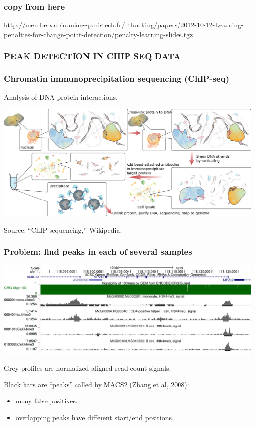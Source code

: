 \documentclass{beamer}
\begin{document}
\begin{frame}
  \frametitle{copy from here}
  http://members.cbio.mines-paristech.fr/~thocking/papers/2012-10-12-Learning-penalties-for-change-point-detection/penalty-learning-slides.tgz
\end{frame}

\begin{frame}
  \frametitle{PEAK DETECTION IN CHIP SEQ DATA}
  
\end{frame}

\begin{frame}
  \frametitle{Chromatin immunoprecipitation sequencing (ChIP-seq)}
  Analysis of DNA-protein interactions.

  \includegraphics[width=\textwidth]{Chromatin_immunoprecipitation_sequencing_wide.png}

  Source: ``ChIP-sequencing,'' Wikipedia.
\end{frame}

\begin{frame}
  \frametitle{Problem: find peaks in each of several samples}
  \includegraphics[width=\textwidth]{screenshot-ucsc-edited}

  Grey profiles are normalized aligned read count signals.

  Black bars are ``peaks'' called by MACS2 (Zhang et al, 2008):
  \begin{itemize}
  \item many false positives.
  \item overlapping peaks have different start/end positions.
  \end{itemize}
\end{frame}
\end{document}
